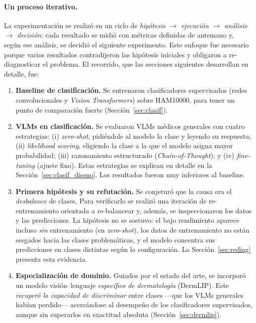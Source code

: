 \documentclass[11pt, a4paper]{article}
\begin{document}
\paragraph{Un proceso iterativo.} La experimentación se realizó en un ciclo de
\emph{hipótesis $\rightarrow$ ejecución $\rightarrow$ análisis $\rightarrow$ decisión}: cada resultado
se midió con métricas definidas de antemano y, según ese análisis, se decidió el siguiente experimento.
Este enfoque fue necesario porque varios resultados contradijeron las hipótesis iniciales y obligaron a
re-diagnosticar el problema. El recorrido, que las secciones siguientes desarrollan en detalle, fue:

\begin{enumerate}[leftmargin=1.6em]
  \item \textbf{Baseline de clasificación.} Se entrenaron clasificadores supervisados (redes
  convolucionales y \emph{Vision Transformers}) sobre HAM10000, para tener un punto de comparación
  fuerte (Sección~\ref{sec:clasif}).
  \item \textbf{VLMs en clasificación.} Se evaluaron VLMs médicos generales con cuatro estrategias:
  (i) \emph{zero-shot}, pidiéndole al modelo la clase y leyendo su respuesta; (ii) \emph{likelihood
  scoring}, eligiendo la clase a la que el modelo asigna mayor probabilidad; (iii) razonamiento
  estructurado (\emph{Chain-of-Thought}); y (iv) \emph{fine-tuning} (ajuste fino). Estas estrategias se
  explican en detalle en la Sección~\ref{sec:clasif_diseno}. Los resultados fueron muy inferiores al
  baseline.
  \item \textbf{Primera hipótesis y su refutación.} Se conjeturó que la causa era el \emph{desbalance}
  de clases. Para verificarlo se realizó una iteración de re-entrenamiento orientada a re-balancear y,
  además, se inspeccionaron los datos y las predicciones. La hipótesis no se sostuvo: el bajo
  rendimiento aparece incluso \emph{sin} entrenamiento (en \emph{zero-shot}), los datos de entrenamiento
  no están sesgados hacia las clases problemáticas, y el modelo concentra sus predicciones en clases
  distintas según la configuración. La Sección~\ref{sec:rediag} presenta esta evidencia.
  \item \textbf{Especialización de dominio.} Guiados por el estado del arte, se incorporó un modelo
  visión--lenguaje \emph{específico de dermatología} (DermLIP). Este \emph{recuperó la capacidad de
  discriminar} entre clases —que los VLMs generales habían perdido— acercándose al desempeño de los
  clasificadores supervisados, aunque sin superarlos en exactitud absoluta (Sección~\ref{sec:dermlip}).

\end{enumerate}
\end{document}
